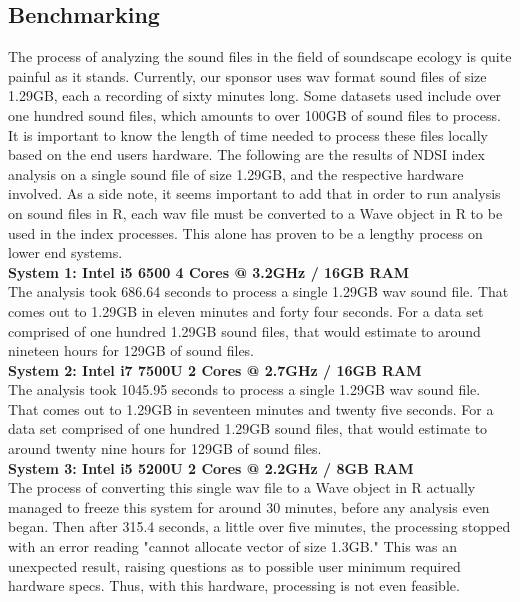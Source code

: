 \subsection{Benchmarking}
The process of analyzing the sound files in the field of soundscape ecology is quite painful as it stands. Currently, our sponsor uses wav format sound files of size 1.29GB, each a recording of sixty minutes long. Some datasets used include over one hundred sound files, which amounts to over 100GB of sound files to process. It is important to know the length of time needed to process these files locally based on the end user\textquotesingle s hardware. The following are the results of NDSI index analysis on a single sound file of size 1.29GB, and the respective hardware involved. As a side note, it seems important to add that in order to run analysis on sound files in R, each wav file must be converted to a Wave object in R to be used in the index processes. This alone has proven to be a lengthy process on lower end systems.\\

\noindent\textbf{System 1: Intel i5 6500 4 Cores @ 3.2GHz / 16GB RAM}\\
The analysis took 686.64 seconds to process a single 1.29GB wav sound file. That comes out to 1.29GB in eleven minutes and forty four seconds. For a data set comprised of one hundred 1.29GB sound files, that would estimate to around nineteen hours for 129GB of sound files.\\

\noindent\textbf{System 2: Intel i7 7500U 2 Cores @ 2.7GHz / 16GB RAM}\\
The analysis took 1045.95 seconds to process a single 1.29GB wav sound file. That comes out to 1.29GB in seventeen minutes and twenty five seconds. For a data set comprised of one hundred 1.29GB sound files, that would estimate to around twenty nine hours for 129GB of sound files.\\

\noindent\textbf{System 3: Intel i5 5200U 2 Cores @ 2.2GHz / 8GB RAM}\\
The process of converting this single wav file to a Wave object in R actually managed to freeze this system for around 30 minutes, before any analysis even began. Then after 315.4 seconds, a little over five minutes, the processing stopped with an error reading "cannot allocate vector of size 1.3GB." This was an unexpected result, raising questions as to possible user minimum required hardware specs. Thus, with this hardware, processing is not even feasible.\\

